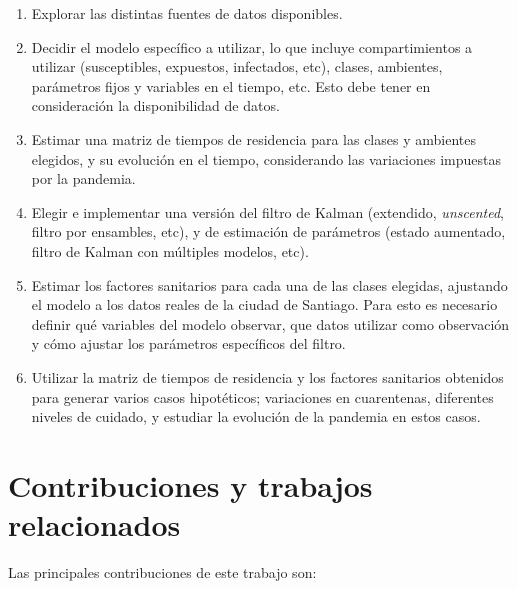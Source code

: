 \begin{intro}
\begin{enumerate}
    \item Explorar las distintas fuentes de datos disponibles.
    \item Decidir el modelo específico a utilizar, lo que incluye compartimientos a utilizar (susceptibles, expuestos, infectados, etc), clases, ambientes, parámetros fijos y variables en el tiempo, etc. Esto debe tener en consideración la disponibilidad de datos.
    \item Estimar una matriz de tiempos de residencia para las clases y ambientes elegidos, y su evolución en el tiempo, considerando las variaciones impuestas por la pandemia.
    \item Elegir e implementar una versión del filtro de Kalman (extendido, \textit{unscented}, filtro por ensambles, etc), y de estimación de parámetros (estado aumentado, filtro de Kalman con múltiples modelos, etc). 
    \item Estimar los factores sanitarios para cada una de las clases elegidas, ajustando el modelo a los datos reales de la ciudad de Santiago. Para esto es necesario definir qué variables del modelo observar, que datos utilizar como observación y cómo ajustar los parámetros específicos del filtro.
    \item Utilizar la matriz de tiempos de residencia y los factores sanitarios obtenidos para generar varios casos hipotéticos; variaciones en cuarentenas, diferentes niveles de cuidado, y estudiar la evolución de la pandemia en estos casos.
\end{enumerate}



\section*{Contribuciones y trabajos relacionados}

Las principales contribuciones de este trabajo son: 


\end{intro}
